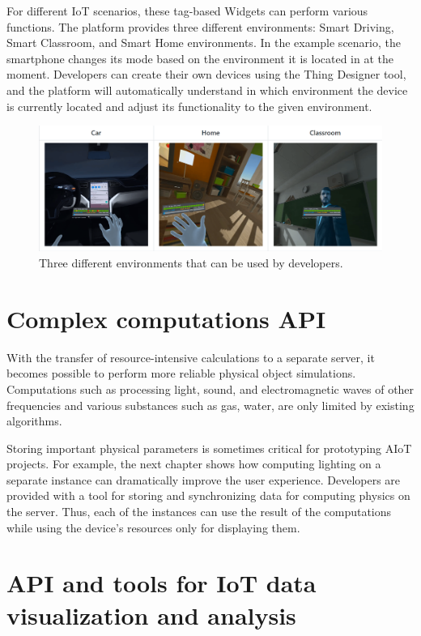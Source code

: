 For different IoT scenarios, these tag-based Widgets can perform various functions. The platform provides three different environments: Smart Driving, Smart Classroom, and Smart Home environments. In the example scenario, the smartphone changes its mode based on the environment it is located in at the moment. Developers can create their own devices using the Thing Designer tool, and the platform will automatically understand in which environment the device is currently located and adjust its functionality to the given environment. 

\begin{figure}
  \centering
  \includegraphics[width=0.9\linewidth]{figures/Environments.png}
  \caption{Three different environments that can be used by developers.}
  \label{fig:Environments-figure}
\end{figure}

\section{Complex computations API}

With the transfer of resource-intensive calculations to a separate server, it becomes possible to perform more reliable physical object simulations. Computations such as processing light, sound, and electromagnetic waves of other frequencies and various substances such as gas, water, are only limited by existing algorithms. 

Storing important physical parameters is sometimes critical for prototyping AIoT projects. For example, the next chapter shows how computing lighting on a separate instance can dramatically improve the user experience. Developers are provided with a tool for storing and synchronizing data for computing physics on the server. Thus, each of the instances can use the result of the computations while using the device's resources only for displaying them. 

\section{API and tools for IoT data visualization and analysis}

